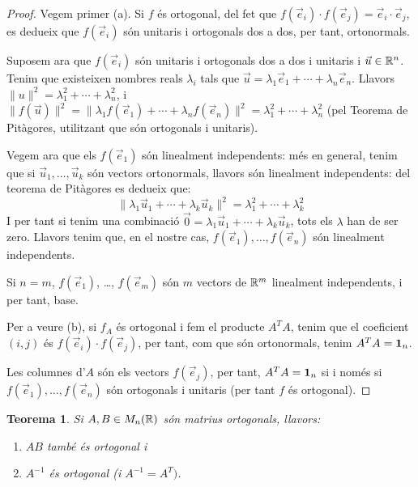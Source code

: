 \documentclass[
  11pt,
]{book}
\numberwithin{dummy}{section}
\theoremstyle{maincolornumbox}
\newtheorem{theorem}{TTTT}[chapter]
\newtheorem{theoremeT}{Teorema}[chapter]
\theoremstyle{blacknumex}
\theoremstyle{blacknumbox}
\theoremstyle{maincolornum}
\renewenvironment{theorem}{\begin{tBox}\begin{theoremeT}}{\end{theoremeT}\end{tBox}}
\begin{document}
\begin{proof}
Vegem primer (a). Si \(f\) és ortogonal, del fet que
\(f(\vec e_i)\cdot f(\vec e_j)=\vec e_i\cdot \vec e_j\), es dedueix que
\(f(\vec e_i)\) són unitaris i ortogonals dos a dos, per tant,
ortonormals.

Suposem ara que \(f(\vec e_i)\) són unitaris i ortogonals dos a dos i
unitaris i \(\vec u \in \mathbb{R}^n\). Tenim que existeixen nombres reals
\(\lambda_i\) tals que
\(\vec u= \lambda_1\vec e_1+ \cdots + \lambda_n\vec e_n\). Llavors
\(\|u\|^2=\lambda_1^2+ \cdots + \lambda_n^2\), i
\(\|f(\vec u)\|^2=\|\lambda_1 f(\vec e_1)+\cdots + \lambda_n f(\vec e_n)\|^2=\lambda_1^2+ \cdots + \lambda_n^2\)
(pel Teorema de Pitàgores, utilitzant que són ortogonals i unitaris).

Vegem ara que els \(f(\vec e_1)\) són linealment independents: més en
general, tenim que si \(\vec u_1, \dots, \vec u_k\) són vectors
ortonormals, llavors són linealment independents: del teorema de
Pitàgores es dedueix que:
\[\|\lambda_1\vec u_1 + \cdots + \lambda_k \vec u_k\|^2=\lambda_1^2 + \cdots + \lambda_k^2\]
I per tant si tenim una combinació
\(\vec 0 = \lambda_1\vec u_1 + \cdots + \lambda_k \vec u_k\), tots els
\(\lambda\) han de ser zero. Llavors tenim que, en el nostre cas,
\(f(\vec e_1), \dots, f(\vec e_n)\) són linealment independents.

Si \(n=m\), \(f(\vec e_1)\), \ldots, \(f(\vec e_m)\) són \(m\) vectors de \(\mathbb{R}^m\)
linealment independents, i per tant, base.

Per a veure (b), si \(f_A\) és ortogonal i fem el producte \(A^TA\), tenim
que el coeficient \((i,j)\) és \(f(\vec e_i)\cdot f(\vec e_j)\), per tant,
com que són ortonormals, tenim \(A^TA=\mathbf{1}_n\).

Les columnes d'\(A\) són els vectors \(f(\vec e_j)\), per tant, \(A^TA=\mathbf{1}_n\)
si i només si \(f(\vec e_1), \dots, f(\vec e_n)\) són ortogonals i
unitaris (per tant \(f\) és ortogonal).
\end{proof}

\begin{theorem}

Si \(A,B \in M_n(\mathbb{R})\) són matrius ortogonals, llavors:

\begin{enumerate}
\def\labelenumi{\arabic{enumi}.}
\item
  \(AB\) també és ortogonal i
\item
  \(A^{-1}\) és ortogonal (i \(A^{-1}=A^T)\).
\end{enumerate}

\end{theorem}
\end{document}
